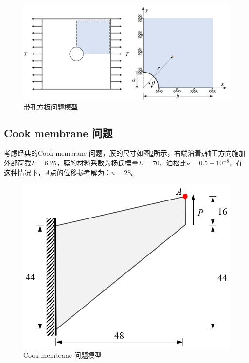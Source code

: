 \begin{figure}[!h]
    \centering 
        \includegraphics[scale=0.5]{figures/hole.png}
        \caption{带孔方板问题模型}\label{ch_4:fig:hole}
\end{figure}

\subsection{Cook membrane 问题}
考虑经典的Cook membrane 问题，膜的尺寸如图\ref{ch_4:fig:cook}所示，右端沿着$y$轴正方向施加外部荷载$P=6.25$，膜的材料系数为杨氏模量$E=70$、泊松比$\nu=0.5-10^{-8}$。在这种情况下，$A$点的位移参考解为：$u=28$。
\begin{figure}[!h]
    \centering 
        \includegraphics[scale=0.8]{figures/cook.png}
        \caption{Cook membrane 问题模型}\label{ch_4:fig:cook}
\end{figure}

